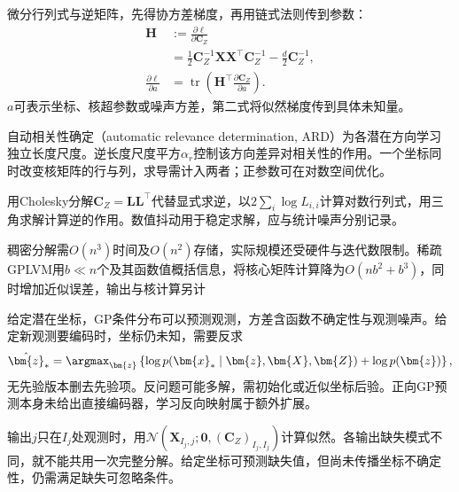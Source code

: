 微分行列式与逆矩阵，先得协方差梯度，再用链式法则传到参数：
\begin{equation}
\label{eq:dim-gplvm-gradient}
\begin{aligned}
\bm{H}&:=\frac{\partial\ell}{\partial\bm{C}_Z}\\
&=\frac12\bm{C}_Z^{-1}\bm{X}\bm{X}^\top\bm{C}_Z^{-1}
-\frac d2\bm{C}_Z^{-1},\\
\frac{\partial\ell}{\partial a}
&=\operatorname{tr}\left(
\bm{H}^\top\frac{\partial\bm{C}_Z}{\partial a}\right).
\end{aligned}
\end{equation}
$a$可表示坐标、核超参数或噪声方差，第二式将似然梯度传到具体未知量。

自动相关性确定（automatic relevance determination, ARD）为各潜在方向学习独立长度尺度。逆长度尺度平方$\alpha_r$控制该方向差异对相关性的作用。一个坐标同时改变核矩阵的行与列，求导需计入两者；正参数可在对数空间优化。

用Cholesky分解$\bm{C}_Z=\bm{L}\bm{L}^\top$代替显式求逆，以$2\sum_i\log L_{i,i}$计算对数行列式，用三角求解计算逆的作用。数值抖动用于稳定求解，应与统计噪声分别记录。

稠密分解需$O(n^3)$时间及$O(n^2)$存储，实际规模还受硬件与迭代数限制。稀疏GPLVM用$b\ll n$个及其函数值概括信息，将核心矩阵计算降为$O(nb^2+b^3)$，同时增加近似误差，输出与核计算另计

给定潜在坐标，GP条件分布可以预测观测，方差含函数不确定性与观测噪声。给定新观测要编码时，坐标仍未知，需要反求
\begin{equation}
\label{eq:dim-gplvm-encoding}
\hat{\bm{z}}_*=\argmax_{\bm{z}}
\left\{\log p(\bm{x}_*\mid\bm{z},\bm{X},\bm{Z})
+\log p(\bm{z})\right\},
\end{equation}
无先验版本删去先验项。反问题可能多解，需初始化或近似坐标后验。正向GP预测本身未给出直接编码器，学习反向映射属于额外扩展。

输出$j$只在$I_j$处观测时，用$\mathcal{N}(\bm{X}_{I_j,j};\bm{0},(\bm{C}_Z)_{I_j,I_j})$计算似然。各输出缺失模式不同，就不能共用一次完整分解。给定坐标可预测缺失值，但尚未传播坐标不确定性，仍需满足缺失可忽略条件。

